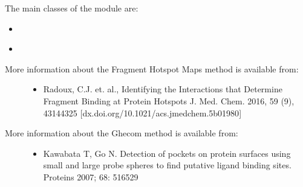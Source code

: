 \documentclass[letterpaper,10pt,english]{sphinxmanual}
\begin{document}
The main classes of the {\hyperref[\detokenize{calculation_api:module-hotspots.calculation}]{}} module are:
\begin{itemize}
\item {} 
{\hyperref[\detokenize{calculation_api:hotspots.calculation.Buriedness}]{}}

\item {} 
{\hyperref[\detokenize{calculation_api:hotspots.calculation.Runner}]{}}

\end{itemize}
\begin{description}
\item[{More information about the Fragment Hotspot Maps method is available from:}] \leavevmode\begin{itemize}
\item {} 
Radoux, C.J. et. al., Identifying the Interactions that Determine Fragment Binding at Protein Hotspots J. Med. Chem. 2016, 59 (9), 4314\sphinxhyphen{}4325 {[}dx.doi.org/10.1021/acs.jmedchem.5b01980{]}

\end{itemize}

\item[{More information about the Ghecom method is available from:}] \leavevmode\begin{itemize}
\item {} 
Kawabata T, Go N. Detection of pockets on protein surfaces using small and large probe spheres to find putative ligand binding sites. Proteins 2007; 68: 516\sphinxhyphen{}529

\end{itemize}

\end{description}
\end{document}
